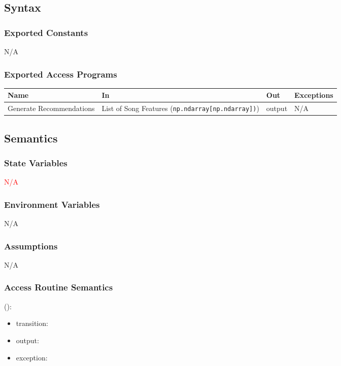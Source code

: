 \documentclass[12pt, titlepage]{article}
\begin{document}
\subsection{Syntax}

\subsubsection{Exported Constants}
N/A

\subsubsection{Exported Access Programs}

\begin{center}
\begin{tabular}{p{2cm} p{4cm} p{4cm} p{2cm}}
\hline
\textbf{Name} & \textbf{In} & \textbf{Out} & \textbf{Exceptions}\\
\hline
Generate Recommendations &List of Song Features (\texttt{np.ndarray[\texttt{np.ndarray}])}) &output &N/A\\
\hline
\end{tabular}
\end{center}

\subsection{Semantics}

\subsubsection{State Variables}
\textcolor{red}{N/A}

\subsubsection{Environment Variables}
N/A

\subsubsection{Assumptions}
N/A

\subsubsection{Access Routine Semantics}

\noindent {}():
\begin{itemize}
\item transition:  
\item output:  
\item exception:  
\end{itemize}
\end{document}
